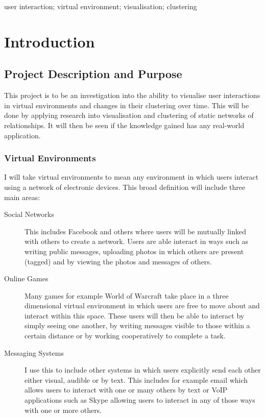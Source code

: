 \documentclass[12pt,a4paper]{article}
\begin{document}
\begin{keywords}
user interaction; virtual environment; visualisation; clustering
\end{keywords}

\section{Introduction}

\subsection{Project Description and Purpose}
This project is to be an investigation into the ability to visualise user interactions in virtual environments and changes in their clustering over time. This will be done by applying research into visualisation and clustering of static networks of relationships. It will then be seen if the knowledge gained has any real-world application.

\subsubsection{Virtual Environments}
I will take virtual environments to mean any environment in which users interact using a network of electronic devices. This broad definition will include three main areas:
\begin{description}
\item[Social Networks] This includes Facebook and others where users will be mutually linked with others to create a network. Users are able interact in ways such as writing public messages, uploading photos in which others are present (tagged) and by viewing the photos and messages of others.
\item[Online Games] Many games for example World of Warcraft take place in a three dimensional virtual environment in which users are free to move about and interact within this space. These users will then be able to interact by simply seeing one another, by writing messages visible to those within a certain distance or by working cooperatively to complete a task.
\item[Messaging Systems] I use this to include other systems in which users explicitly send each other either visual, audible or by text. This includes for example email which allows users to interact with one or many others by text or VoIP applications such as Skype allowing users to interact in any of those ways with one or more others.
\end{description}
\end{document}
